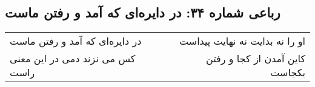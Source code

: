 \begin{center}
\section*{رباعی شماره ۳۴: در دایره‌ای که آمد و رفتن ماست}
\label{sec:sh034}
\begin{longtable}{l p{0.5cm} r}
در دایره‌ای که آمد و رفتن ماست
&&
او را نه بدایت نه نهایت پیداست
\\
کس می نزند دمی در این معنی راست
&&
کاین آمدن از کجا و رفتن بکجاست
\\
\end{longtable}
\end{center}
